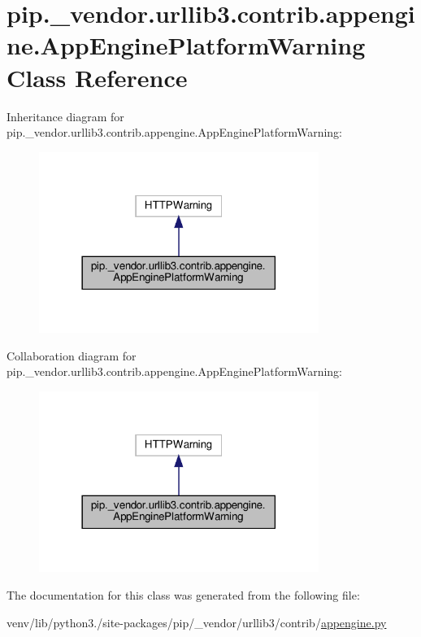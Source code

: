 \hypertarget{classpip_1_1__vendor_1_1urllib3_1_1contrib_1_1appengine_1_1AppEnginePlatformWarning}{}\section{pip.\+\_\+vendor.\+urllib3.\+contrib.\+appengine.\+App\+Engine\+Platform\+Warning Class Reference}
\label{classpip_1_1__vendor_1_1urllib3_1_1contrib_1_1appengine_1_1AppEnginePlatformWarning}


Inheritance diagram for pip.\+\_\+vendor.\+urllib3.\+contrib.\+appengine.\+App\+Engine\+Platform\+Warning\+:
\nopagebreak
\begin{figure}[H]
\begin{center}
\leavevmode
\includegraphics[width=258pt]{classpip_1_1__vendor_1_1urllib3_1_1contrib_1_1appengine_1_1AppEnginePlatformWarning__inherit__graph}
\end{center}
\end{figure}


Collaboration diagram for pip.\+\_\+vendor.\+urllib3.\+contrib.\+appengine.\+App\+Engine\+Platform\+Warning\+:
\nopagebreak
\begin{figure}[H]
\begin{center}
\leavevmode
\includegraphics[width=258pt]{classpip_1_1__vendor_1_1urllib3_1_1contrib_1_1appengine_1_1AppEnginePlatformWarning__coll__graph}
\end{center}
\end{figure}


The documentation for this class was generated from the following file\+:\begin{DoxyCompactItemize}
\item 
venv/lib/python3./site-\/packages/pip/\+\_\+vendor/urllib3/contrib/\hyperlink{appengine_8py}{appengine.\+py}\end{DoxyCompactItemize}
